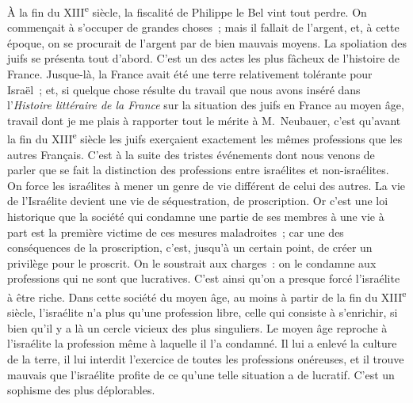 \documentclass[french,twoside]{book} %
\newcommand\orgName[1]{#1}
\newcommand\persName[1]{#1}
\newcommand\placeName[1]{#1}
\begin{document}
À la fin du XIII\textsuperscript{e} siècle, la fiscalité de {\persName Philippe le Bel} vint tout perdre. On commençait à s’occuper de grandes choses ; mais il fallait de l’argent, et, à cette époque, on se procurait de l’argent par de bien mauvais moyens. La spoliation des juifs se présenta tout d’abord. C’est un des actes les plus fâcheux de l’histoire de {\orgName France}. Jusque-là, la {\orgName France} avait été une terre relativement tolérante pour {\orgName Israël} ; et, si quelque chose résulte du travail que nous avons inséré dans l’{\itshape Histoire littéraire de la France} sur la situation des juifs en {\placeName France} au moyen âge, travail dont je me plais à rapporter tout le mérite à {\persName M. Neubauer}, c’est qu’avant la fin du XIII\textsuperscript{e} siècle les {\orgName juifs} exerçaient exactement les mêmes professions que les autres {\orgName Français}. C’est à la suite des tristes événements dont nous venons de parler que se fait la distinction des professions entre {\orgName israélites} et {\orgName non-israélites}. On force les {\orgName israélites} à mener un genre de vie différent de celui des autres. La vie de l’Israélite devient une vie de séquestration, de proscription. Or c’est une loi historique que la société qui condamne une partie de ses membres à une vie à part est la première victime de ces mesures maladroites ; car une des conséquences de la proscription, c’est, jusqu’à un certain point, de créer un privilège pour le proscrit. On le soustrait aux charges : on le condamne aux professions qui ne sont que lucratives. C’est ainsi qu’on a presque forcé l’israélite à être riche. Dans cette société du moyen âge, au moins à partir de la fin du XIII\textsuperscript{e} siècle, l’israélite n’a plus qu’une profession libre, celle qui consiste à s’enrichir, si bien qu’il y a là un cercle vicieux des plus singuliers. Le moyen âge reproche à l’israélite la profession même à laquelle il l’a condamné. Il lui a enlevé la culture de la terre, il lui interdit l’exercice de toutes les professions onéreuses, et il trouve mauvais que l’israélite profite de ce qu’une telle situation a de lucratif. C’est un sophisme des plus déplorables.\par
\end{document}
